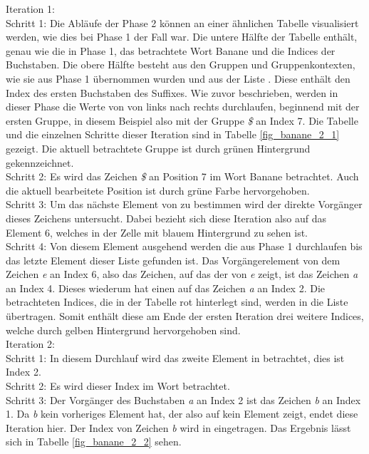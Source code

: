 Iteration 1:\\
Schritt 1: Die Abläufe der Phase 2 können an einer ähnlichen Tabelle visualisiert werden, wie dies bei Phase 1 der Fall war.
Die untere Hälfte der Tabelle enthält, genau wie die in Phase 1, das betrachtete Wort Banane und die Indices der Buchstaben. 
Die obere Hälfte besteht aus den Gruppen und Gruppenkontexten, wie sie aus Phase 1 übernommen wurden und aus der Liste \sa. 
Diese enthält den Index des ersten Buchstaben des Suffixes.
Wie zuvor beschrieben, werden in dieser Phase die Werte von \sa von links nach rechts durchlaufen, beginnend mit der ersten Gruppe, in diesem Beispiel also mit der Gruppe \textit{\$} an Index 7. 
Die Tabelle und die einzelnen Schritte dieser Iteration sind in Tabelle \ref{fig_banane_2_1} gezeigt. 
Die aktuell betrachtete Gruppe ist durch grünen Hintergrund gekennzeichnet. \\
Schritt 2: Es wird das Zeichen \textit{\$} an Position 7 im Wort Banane betrachtet. 
Auch die aktuell bearbeitete Position ist durch grüne Farbe hervorgehoben. \\
Schritt 3: Um das nächste Element von \sa zu bestimmen wird der direkte Vorgänger dieses Zeichens untersucht. 
Dabei bezieht sich diese Iteration also auf das Element 6, welches in der Zelle mit blauem Hintergrund zu sehen ist. \\
Schritt 4: Von diesem Element ausgehend werden die \prevpointer aus Phase 1 durchlaufen bis das letzte Element dieser Liste gefunden ist. 
Das Vorgängerelement von dem Zeichen \textit{e} an Index 6, also das Zeichen, auf das der \prevpointer von \textit{e} zeigt, ist das Zeichen \textit{a} an Index 4. 
Dieses wiederum hat einen \prevpointer auf das Zeichen \textit{a} an Index 2. 
Die betrachteten Indices, die in der Tabelle rot hinterlegt sind, werden in die Liste \sa übertragen. 
Somit enthält diese am Ende der ersten Iteration drei weitere Indices, welche durch gelben Hintergrund hervorgehoben sind. \\

Iteration 2:\\
Schritt 1: In diesem Durchlauf wird das zweite Element in \sa betrachtet, dies ist Index 2.\\
Schritt 2: Es wird dieser Index im Wort betrachtet.\\
Schritt 3: Der Vorgänger des Buchstaben \textit{a} an Index 2 ist das Zeichen \textit{b} an Index 1. 
Da \textit{b} kein vorheriges Element hat, der \prevpointer also auf kein Element zeigt, endet diese Iteration hier. 
Der Index von Zeichen \textit{b} wird in \sa eingetragen. Das Ergebnis lässt sich in Tabelle \ref{fig_banane_2_2} sehen.\\

